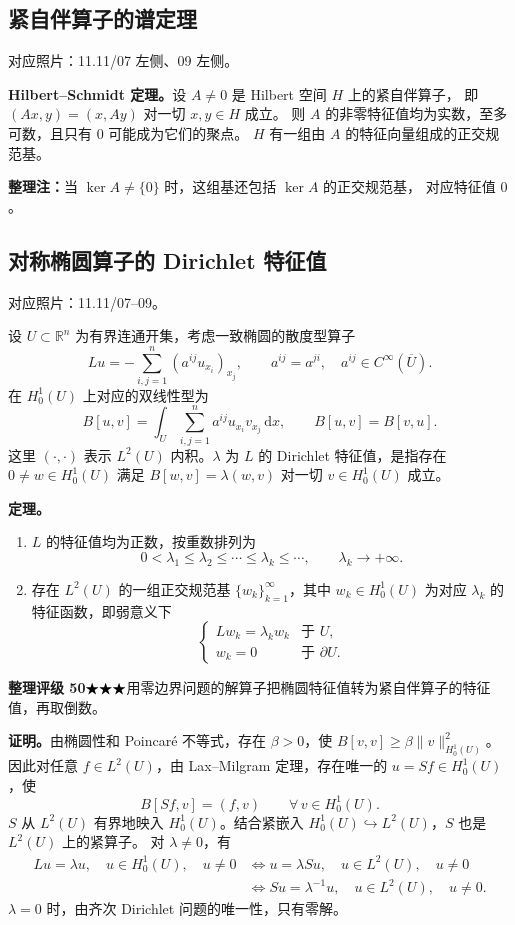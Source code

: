 \documentclass[UTF8,a4paper,11pt,fontset=fandol]{ctexart}
\newcommand{\R}{\mathbb R}
\newcommand{\dd}{\,\mathrm d}
\newcommand{\Ub}{\overline U}
\newcommand{\ednote}[1]{\par{\small\color{notegray}\textbf{整理注：}#1}\par}
\newcommand{\source}[1]{{\small\color{notegray}对应照片：#1。}\par}
\newcommand{\proofstars}[1]{\ensuremath{%
\ifnum#1>0\relax\bigstar\fi
\ifnum#1>1\relax\bigstar\fi
\ifnum#1>2\relax\bigstar\fi
\ifnum#1>3\relax\bigstar\fi
\ifnum#1>4\relax\bigstar\fi}}
\newcommand{\proofrating}[3]{\par{\small\color{proofblue}%
\textbf{整理评级 #1}\enspace\proofstars{#2}\quad #3\par}}
\begin{document}
\subsection{紧自伴算子的谱定理}
\source{11.11/07 左侧、09 左侧}
\textbf{Hilbert--Schmidt 定理。}设 $A\ne0$ 是 Hilbert 空间 $H$ 上的紧自伴算子，
即 $(Ax,y)=(x,Ay)$ 对一切 $x,y\in H$ 成立。
则 $A$ 的非零特征值均为实数，至多可数，且只有 $0$ 可能成为它们的聚点。
$H$ 有一组由 $A$ 的特征向量组成的正交规范基。
\ednote{当 $\ker A\ne\{0\}$ 时，这组基还包括 $\ker A$ 的正交规范基，
对应特征值 $0$。}

\newpage
\subsection{对称椭圆算子的 Dirichlet 特征值}
\source{11.11/07--09}
设 $U\subset\R^n$ 为有界连通开集，考虑一致椭圆的散度型算子
\[
Lu=-\sum_{i,j=1}^n(a^{ij}u_{x_i})_{x_j},
\qquad a^{ij}=a^{ji},\quad a^{ij}\in C^\infty(\Ub).
\]
在 $H_0^1(U)$ 上对应的双线性型为
\[
B[u,v]=\int_U\sum_{i,j=1}^n a^{ij}u_{x_i}v_{x_j}\dd x,
\qquad B[u,v]=B[v,u].
\]
这里 $(\cdot,\cdot)$ 表示 $L^2(U)$ 内积。$\lambda$ 为 $L$ 的 Dirichlet
特征值，是指存在 $0\ne w\in H_0^1(U)$ 满足
$B[w,v]=\lambda(w,v)$ 对一切 $v\in H_0^1(U)$ 成立。

\textbf{定理。}
\begin{enumerate}
\item $L$ 的特征值均为正数，按重数排列为
\[
0<\lambda_1\leq\lambda_2\leq\cdots\leq\lambda_k\leq\cdots,
\qquad \lambda_k\longrightarrow+\infty.
\]
\item 存在 $L^2(U)$ 的一组正交规范基 $\{w_k\}_{k=1}^\infty$，其中
$w_k\in H_0^1(U)$ 为对应 $\lambda_k$ 的特征函数，即弱意义下
\[
\begin{cases}
Lw_k=\lambda_k w_k & \text{于 }U,\\
w_k=0 & \text{于 }\partial U.
\end{cases}
\]
\end{enumerate}

\proofrating{50}{3}{用零边界问题的解算子把椭圆特征值转为紧自伴算子的特征值，再取倒数。}
\textbf{证明。}由椭圆性和 Poincaré 不等式，存在 $\beta>0$，使
$B[v,v]\geq\beta\|v\|_{H_0^1(U)}^2$。
因此对任意 $f\in L^2(U)$，由 Lax--Milgram 定理，存在唯一的
$u=Sf\in H_0^1(U)$，使
\[
B[Sf,v]=(f,v)\qquad \forall\,v\in H_0^1(U).
\]
$S$ 从 $L^2(U)$ 有界地映入 $H_0^1(U)$。结合紧嵌入
$H_0^1(U)\hookrightarrow L^2(U)$，$S$ 也是 $L^2(U)$ 上的紧算子。
对 $\lambda\ne0$，有
\[
\begin{aligned}
Lu=\lambda u,\quad u\in H_0^1(U),\quad u\ne0
&\iff u=\lambda Su,\quad u\in L^2(U),\quad u\ne0\\
&\iff Su=\lambda^{-1}u,\quad u\in L^2(U),\quad u\ne0.
\end{aligned}
\]
$\lambda=0$ 时，由齐次 Dirichlet 问题的唯一性，只有零解。
\end{document}
